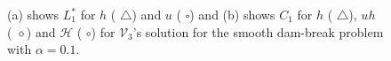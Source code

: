 \documentclass[SingleSpace,12pt,Proceedings]{Serre_ASCE}
\begin{document}
\begin{figure}
	\centering
	\caption{(a) shows $L_1^*$ for $h$ ({\color{red} $\triangle$}) and $u$ ({\color{blue} $\square$}) and (b) shows $C_1$ for $h$ ({\color{red} $\triangle$}), $uh$ ({\color{black} $\diamond$}) and $\mathcal{H}$ ({\color{blue} $\circ$}) for $\mathcal{V}_3$'s solution for the smooth dam-break problem with $\alpha = 0.1$.}
	\label{fig:o3a4dxlimmeasure}
\end{figure}


\end{document}
